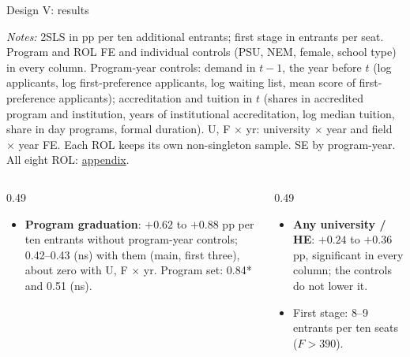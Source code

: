 \documentclass{beamer}
\begin{document}
\begin{frame}[label=d5-results]{Design V: results}
\centering
\tiny
\resizebox{0.80\textwidth}{!}{}

\vspace{0.02cm}
\parbox{0.97\textwidth}{\tiny \textit{Notes:} 2SLS in pp per ten additional entrants; first stage in entrants per seat. Program and ROL FE and individual controls (PSU, NEM, female, school type) in every column. Program-year controls: demand in $t-1$, the year before $t$ (log applicants, log first-preference applicants, log waiting list, mean score of first-preference applicants); accreditation and tuition in $t$ (shares in accredited program and institution, years of institutional accreditation, log median tuition, share in day programs, formal duration). U, F $\times$ yr: university $\times$ year and field $\times$ year FE. Each ROL keeps its own non-singleton sample. SE by program-year. All eight ROL: \hyperlink{d5-app-rol-ctrl}{\color{blue}appendix}.}

\vspace{0.05cm}
\raggedright
\begin{columns}[T,onlytextwidth]
\begin{column}{0.49\textwidth}
\scriptsize
\begin{itemize}
    \setlength{\itemsep}{1pt}
    \item \textbf{Program graduation}: $+0.62$ to $+0.88$ pp per ten entrants without program-year controls; 0.42--0.43 (ns) with them (main, first three), about zero with U, F $\times$ yr. Program set: 0.84* and 0.51 (ns).
\end{itemize}
\end{column}
\begin{column}{0.49\textwidth}
\scriptsize
\begin{itemize}
    \setlength{\itemsep}{1pt}
    \item \textbf{Any university / HE}: $+0.24$ to $+0.36$ pp, significant in every column; the controls do not lower it.
    \item First stage: 8--9 entrants per ten seats ($F>390$).
\end{itemize}
\end{column}
\end{columns}
\end{frame}
\end{document}
